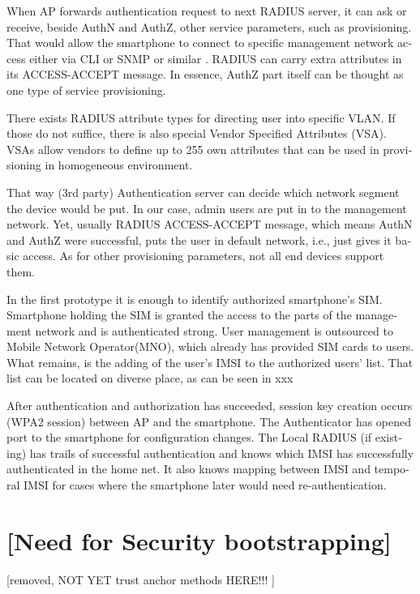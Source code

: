 \documentclass[12pt,a4paper,english]{tutthesis}
\begin{document}
\begin{otherlanguage}{english}
When AP forwards authentication request to next RADIUS server, it can
ask or receive, beside AuthN and AuthZ, other service parameters, such
as provisioning. That would allow the smartphone to connect to
specific management network access either via CLI or SNMP or similar
 \cite[p.4]{rfc5608}.  RADIUS can carry extra attributes in its
ACCESS-ACCEPT message.   In essence, AuthZ part itself can be thought as
one type of service provisioning. 


There exists RADIUS attribute types for directing user into specific
VLAN. If those do not suffice, there is also special Vendor Specified
Attributes (VSA). VSAs allow vendors to define up to 255 own
attributes that can be used in provisioning in homogeneous environment. 


That way (3rd party) Authentication server can decide which network
segment the device would be put.  In our case, admin users are put in
to the management network.  Yet, usually RADIUS ACCESS-ACCEPT message,
which means AuthN and AuthZ were successful,  puts the user in
default network, i.e., just gives it basic access. As for other
provisioning parameters, not all end devices support them.

In the first prototype it is enough to identify authorized
smartphone's SIM.  Smartphone holding the SIM is granted the access to
the parts of the management network and is authenticated strong.  User
management is outsourced to Mobile Network Operator(MNO), which
already has provided SIM cards to users. What remains, is the adding
of the user's IMSI to the authorized users' list. That list can be
located on diverse place, as can be seen in xxx


After authentication and authorization has succeeded, session key
creation occurs (WPA2 session) between AP and the smartphone. 
The Authenticator has opened port to the smartphone for
configuration changes. 
The Local RADIUS (if existing) has trails of successful
authentication and knows which IMSI has successfully authenticated in
the home net. It also knows mapping between IMSI and temporal IMSI for
cases where the smartphone later would need  re-authentication.



\section{[Need for Security bootstrapping]}
\label{sec-4-4}
[removed, NOT YET trust anchor methods HERE!!! ]




\end{otherlanguage}
\end{document}
